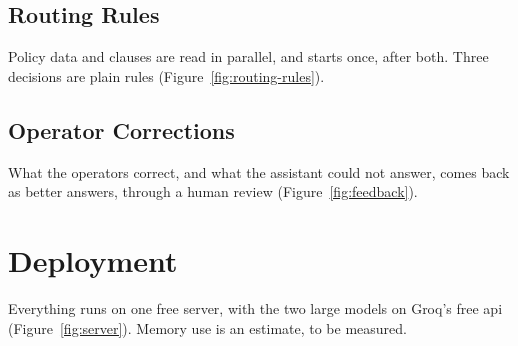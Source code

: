 \subsection{Routing Rules}
\label{sec:routing}

Policy data and clauses are read in parallel, and  starts once, after both. Three
decisions are plain rules (Figure~\ref{fig:routing-rules}).



\needspace{7cm}
\subsection{Operator Corrections}
\label{sec:corrections}

What the operators correct, and what the assistant could not answer, comes back as better
answers, through a human review (Figure~\ref{fig:feedback}).



\section{Deployment}
\label{sec:deployment}

Everything runs on one free server, with the two large models on Groq's free \acs{api}
(Figure~\ref{fig:server}). Memory use is an estimate, to be measured.


